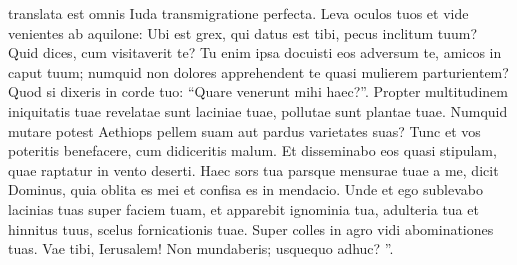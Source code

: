 \begin{biblechapter}
\begin{biblechapter}
\begin{biblechapter}
\begin{biblechapter}
\begin{biblechapter}
\begin{biblechapter}
\begin{biblechapter}
\begin{biblechapter}
\begin{biblechapter}
\begin{biblechapter}
\begin{biblechapter}
\begin{biblechapter}
\begin{biblechapter}
 translata est omnis Iuda
 transmigratione perfecta.
 \verse Leva oculos tuos et vide
 venientes ab aquilone:
 Ubi est grex, qui datus est tibi,
 pecus inclitum tuum?
 \verse Quid dices, cum visitaverit te?
 Tu enim ipsa docuisti eos adversum te,
 amicos in caput tuum;
 numquid non dolores apprehendent te
 quasi mulierem parturientem?
 \verse Quod si dixeris in corde tuo:
 “Quare venerunt mihi haec?”.
 Propter multitudinem iniquitatis tuae
 revelatae sunt laciniae tuae,
 pollutae sunt plantae tuae.
 \verse Numquid mutare potest Aethiops pellem suam
 aut pardus varietates suas?
 Tunc et vos poteritis benefacere,
 cum didiceritis malum.
 \verse Et disseminabo eos quasi stipulam,
 quae raptatur in vento deserti.
 \verse Haec sors tua parsque mensurae tuae a me,
 dicit Dominus,
 quia oblita es mei
 et confisa es in mendacio.
 \verse Unde et ego sublevabo lacinias tuas super faciem tuam,
 et apparebit ignominia tua,
 \verse adulteria tua et hinnitus tuus,
 scelus fornicationis tuae.
 Super colles in agro vidi abominationes tuas.
 Vae tibi, Ierusalem! Non mundaberis;
 usquequo adhuc? ”.
 

\end{biblechapter}
\end{biblechapter}
\end{biblechapter}
\end{biblechapter}
\end{biblechapter}
\end{biblechapter}
\end{biblechapter}
\end{biblechapter}
\end{biblechapter}
\end{biblechapter}
\end{biblechapter}
\end{biblechapter}
\end{biblechapter}
